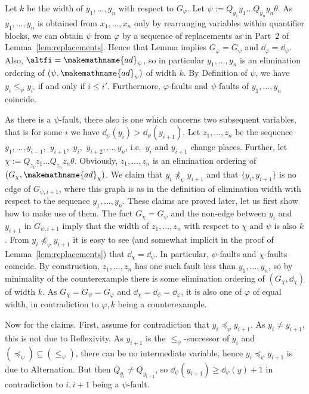 \documentclass{LMCS}
\newcommand{\gfi}{G_{\varphi}}
\renewcommand{\phi}{\varphi}
\newcommand{\ad}{\dd_{\varphi}}
\newcommand{\refl}{Reflexivity}
\newcommand{\alt}{Alternation}
\newcommand{\alte}{\makemathname{ad}}
\begin{document}
Let $k$ be the width of $y_1,\ldots,y_n$ with respect to $\gfi$. 
Let $\psi:=Q_{y_1}y_1\ldots Q_{y_n}y_n\theta$. 
As $y_1,\ldots,y_n$ is obtained from $x_1,\ldots,x_n$ 
only by rearranging variables within quantifier blocks, 
we can obtain $\psi$ from $\phi$ by a sequence of replacements 
as in Part~2 of Lemma~\ref{lem:replacements}. 
Hence that Lemma implies $\gfi=G_{\psi}$ and $\ad=\dd_{\psi}$. 
Also, $\altfi=\alte_{\psi}$,
so in particular $y_1,\ldots,y_n$ 
is an elimination ordering of $(\psi,\alte_{\psi})$ of width $k$. 
By Definition of $\psi$, we have $y_i\leq_{\psi}y_{i'}$ if and only if $i\leq i'$. 
Furthermore, $\phi$-faults and $\psi$-faults of $y_1,\ldots,y_n$ coincide. 

As there is a $\psi$-fault, 
there also is one which concerns two subsequent variables, 
that is for some $i$ we have $\dd_{\psi}(y_i)>\dd_{\psi}(y_{i+1})$. 
Let $z_1,\ldots,z_n$ be the sequence 
$y_1,\ldots,y_{i-1},$ $y_{i+1},$ $y_i,$ $y_{i+2},\ldots,y_n$, 
i.e.~$y_i$ and $y_{i+1}$ change places. 
Further, let $\chi:=Q_{z_1}z_1\ldots Q_{z_n}z_n\theta$. 
Obviously, $z_1,\ldots,z_n$ 
is an elimination ordering of $(G_{\chi},\alte_{\chi})$. 
We claim that $y_i\not\preceq_{\psi}y_{i+1}$ 
and that $\{y_i,y_{i+1}\}$ is no edge of $G_{\psi,i+1}$, 
where this graph is as in the definition of elimination width 
with respect to the sequence $y_1,\ldots,y_n$. 
These claims are proved later, let us first show how to make use of them. 
The fact $G_{\chi}=G_{\psi}$ and the non-edge between $y_i$ and $y_{i+1}$ 
in $G_{\psi,i+1}$ imply that the width of $z_1,\ldots,z_n$ 
with respect to $\chi$ and $\psi$ is also $k$. 
{}From $y_i\not\preceq_{\psi}y_{i+1}$ it is easy to see 
(and somewhat implicit in the proof of Lemma~\ref{lem:replacements}) 
that $\dd_{\chi}=\dd_{\psi}$. 
In particular, $\psi$-faults and $\chi$-faults coincide. 
By construction, $z_1,\ldots,z_n$ 
has one such fault less than $y_1,\ldots,y_n$, 
so by minimality of the counterexample 
there is some elimination ordering of $(G_{\chi},\dd_{\chi})$ of width $k$. 
As $G_{\chi}=G_{\psi}=G_{\phi}$ and $\dd_{\chi}=\dd_{\psi}=\dd_{\phi}$, 
it is also one of $\phi$ of equal width, 
in contradiction to $\phi,k$ being a counterexample. 

Now for the claims. 
First, assume for contradiction that $y_i\preceq_{\psi}y_{i+1}$. 
As $y_i\not=y_{i+1}$, this is not due to \refl. 
As $y_{i+1}$ is the $\leq_{\psi}$-successor of $y_i$ 
and $(\preceq_{\psi})\subseteq(\leq_{\psi})$, 
there can be no intermediate variable, 
hence $y_i\preceq_{\psi}y_{i+1}$ is due to \alt. 
But then $Q_{y_i}\not=Q_{y_{i+1}}$, 
so $\dd_{\psi}(y_{i+1})\geq\dd_{\psi}(y)+1$ 
in contradiction to $i,i+1$ being a $\psi$-fault. 
\end{document}
